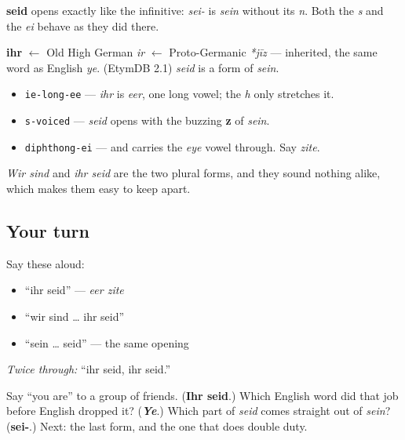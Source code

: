 \textbf{seid} opens exactly like the infinitive: \emph{sei-} is \emph{sein} without its \emph{n}. Both the \emph{s} and the \emph{ei} behave as they did there.

\begin{cousinweb}
\textbf{ihr} $\leftarrow$ Old High German \emph{ir} $\leftarrow$ Proto-Germanic \emph{*jīz} — inherited, the same word as English \emph{ye}. (EtymDB 2.1) \emph{seid} is a form of \emph{sein}.
\end{cousinweb}

\begin{sounds}
\begin{itemize}
\raggedright
  \item \texttt{ie-long-ee} — \emph{ihr} is \emph{eer}, one long vowel; the \emph{h} only stretches it.
  \item \texttt{s-voiced} — \emph{seid} opens with the buzzing \textbf{z} of \emph{sein}.
  \item \texttt{diphthong-ei} — and carries the \emph{eye} vowel through. Say \emph{zite}.
\end{itemize}

\emph{Wir sind} and \emph{ihr seid} are the two plural forms, and they sound nothing alike, which makes them easy to keep apart.
\end{sounds}

\subsection*{Your turn}
Say these aloud:

\begin{itemize}
\raggedright
  \item \textquotedblleft{}ihr seid\textquotedblright{} — \emph{eer zite}
  \item \textquotedblleft{}wir sind … ihr seid\textquotedblright{}
  \item \textquotedblleft{}sein … seid\textquotedblright{} — the same opening
\end{itemize}

\emph{Twice through:} \textquotedblleft{}ihr seid, ihr seid.\textquotedblright{}

\begin{tcolorbox}[breakable,colback=teal!4,colframe=teal!35!black,title={Before you move on}]
Say \textquotedblleft{}you are\textquotedblright{} to a group of friends. (\textbf{Ihr seid}.) Which English word did that job before English dropped it? (\emph{\textbf{Ye}}.) Which part of \emph{seid} comes straight out of \emph{sein}? (\textbf{sei-}.) Next: the last form, and the one that does double duty.
\end{tcolorbox}
